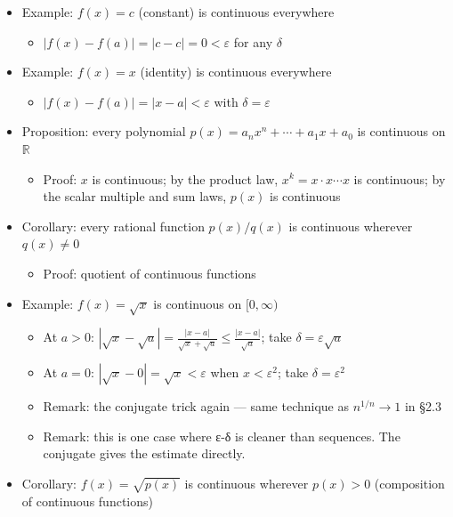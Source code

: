 \documentclass[
  10pt,
  letterpaper,
]{scrbook}
\providecommand{\tightlist}{%
  \setlength{\itemsep}{0pt}\setlength{\parskip}{0pt}}
\newcommand{\RR}{\mathbb{R}}
\begin{document}
\begin{itemize}
\tightlist
\item
  Example: \(f(x) = c\) (constant) is continuous everywhere

  \begin{itemize}
  \tightlist
  \item
    \(|f(x) - f(a)| = |c - c| = 0 < \varepsilon\) for any \(\delta\)
  \end{itemize}
\item
  Example: \(f(x) = x\) (identity) is continuous everywhere

  \begin{itemize}
  \tightlist
  \item
    \(|f(x) - f(a)| = |x - a| < \varepsilon\) with
    \(\delta = \varepsilon\)
  \end{itemize}
\item
  Proposition: every polynomial
  \(p(x) = a_n x^n + \cdots + a_1 x + a_0\) is continuous on \(\RR\)

  \begin{itemize}
  \tightlist
  \item
    Proof: \(x\) is continuous; by the product law,
    \(x^k = x \cdot x \cdots x\) is continuous; by the scalar multiple
    and sum laws, \(p(x)\) is continuous
  \end{itemize}
\item
  Corollary: every rational function \(p(x)/q(x)\) is continuous
  wherever \(q(x) \neq 0\)

  \begin{itemize}
  \tightlist
  \item
    Proof: quotient of continuous functions
  \end{itemize}
\item
  Example: \(f(x) = \sqrt{x}\) is continuous on \([0, \infty)\)

  \begin{itemize}
  \tightlist
  \item
    At \(a > 0\):
    \(|\sqrt{x} - \sqrt{a}| = \frac{|x - a|}{\sqrt{x} + \sqrt{a}} \leq \frac{|x - a|}{\sqrt{a}}\);
    take \(\delta = \varepsilon \sqrt{a}\)
  \item
    At \(a = 0\): \(|\sqrt{x} - 0| = \sqrt{x} < \varepsilon\) when
    \(x < \varepsilon^2\); take \(\delta = \varepsilon^2\)
  \item
    Remark: the conjugate trick again --- same technique as
    \(n^{1/n} \to 1\) in §2.3
  \item
    Remark: this is one case where ε-δ is cleaner than sequences. The
    conjugate gives the estimate directly.
  \end{itemize}
\item
  Corollary: \(f(x) = \sqrt{p(x)}\) is continuous wherever \(p(x) > 0\)
  (composition of continuous functions)
\end{itemize}
\end{document}
